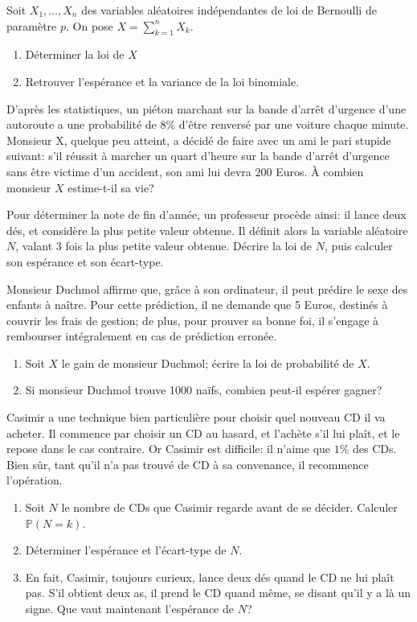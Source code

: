 \documentclass{yann}
\begin{document}
\Exercice

Soit $X_1, \dots, X_n$ des variables aléatoires indépendantes de loi de Bernoulli de paramètre $p$.
On pose $X = ∑_{k=1}^n X_k$.
\begin{enumerate}
\item
Déterminer la loi de $X$
\item
Retrouver l'espérance et la variance de la loi binomiale.
\end{enumerate}

\Exercice

D'après les statistiques, un piéton marchant sur la bande d'arrêt
d'urgence d'une autoroute a une probabilité de $8\%$ d'être renversé
par une voiture chaque minute.
Monsieur X, quelque peu atteint, a décidé de faire avec un ami
le pari stupide suivant:
s'il réussit à marcher un quart d'heure sur la bande d'arrêt d'urgence
sans être victime d'un accident, son ami lui devra $200$ Euros.
À combien monsieur $X$ estime-t-il sa vie?

\Exercice

Pour déterminer la note de fin d'année, un professeur procède ainsi:
il lance deux dés, et considère la plus petite valeur obtenue.
Il définit alors la variable aléatoire $N$, valant $3$ fois la
plus petite valeur obtenue.
Décrire la loi de $N$, puis calculer son espérance et son écart-type.

\Exercice

Monsieur Duchmol affirme que, grâce à son ordinateur, il peut prédire
le sexe des enfants à naître. Pour cette prédiction, il ne demande que
5 Euros, destinés à couvrir les frais de gestion; de plus, pour
\og{}prouver\fg{} sa bonne foi, il s'engage à rembourser intégralement
en cas de prédiction erronée.
\begin{enumerate}
\item
Soit $X$ le gain de monsieur Duchmol; écrire la loi de probabilité de $X$.
\item
Si monsieur Duchmol trouve 1000 naïfs, combien peut-il espérer gagner?
\end{enumerate}

\Exercice

Casimir a une technique bien particulière pour choisir quel nouveau CD il va acheter.
Il commence par choisir un CD au hasard, et l'achète s'il lui plaît,
et le repose dans le cas contraire.
Or Casimir est difficile: il n'aime que $1\%$ des CDs.
Bien sûr, tant qu'il n'a pas trouvé de CD à sa convenance, il recommence l'opération.
\begin{enumerate}
\item
Soit $N$ le nombre de CDs que Casimir regarde avant de se décider.
  Calculer $ℙ(N=k)$.
\item
Déterminer l'espérance et l'écart-type de $N$.
\item
En fait, Casimir, toujours curieux, lance deux dés quand le CD ne lui plaît pas.
  S'il obtient deux as, il prend le CD quand même, se disant qu'il y a là
  un signe. Que vaut maintenant l'espérance de $N$?
\end{enumerate}
\end{document}
